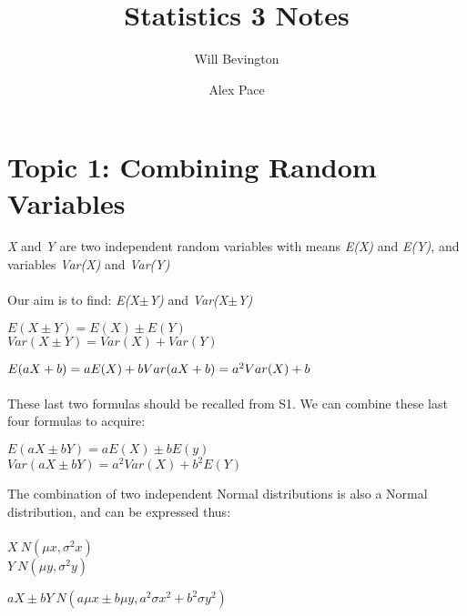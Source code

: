 \documentclass{article}
\title{Statistics 3 Notes}
\author{Will Bevington \and Alex Pace}
\begin{document}
	\maketitle
    \tableofcontents
    \newpage
    \section{Topic 1: Combining Random Variables}
    	\textit{X} and \textit{Y} are two independent random variables with means \textit{E(X)} and \textit{E(Y)}, and variables \textit{Var(X)} and \textit{Var(Y)} \\\\ 
        Our aim is to find: \textit{E(X$\pm$Y)} and \textit{Var(X$\pm$Y)} \\
        \begin{center}
        	$E(X\pm Y) = E(X) \pm E(Y) $ \\ $Var(X\pm Y) = Var(X) + Var(Y)$
        \end{center}
        $E(aX + b) = aE(X) + b \\ Var(aX + b) = a^2Var(X) + b$ \\\\ These last two formulas should be recalled from S1. We can combine these last four formulas to acquire:
        \begin{center}
			$E(aX\pm bY) = aE(X)\pm bE(y)$ \\ $Var(aX\pm bY) = a^2Var(X)+b^2E(Y)$
		\end{center}
        The combination of two independent Normal distributions is also a Normal distribution, and can be expressed thus: \\\\
        $X~N(\mu x , \sigma^2x)$ \\ $Y~N(\mu y , \sigma^2 y)$
        \begin{center}
			$aX\pm bY~N(a\mu x\pm b\mu y , a^2\sigma x^2+b^2\sigma y^2)$
		\end{center}
\end{document}
